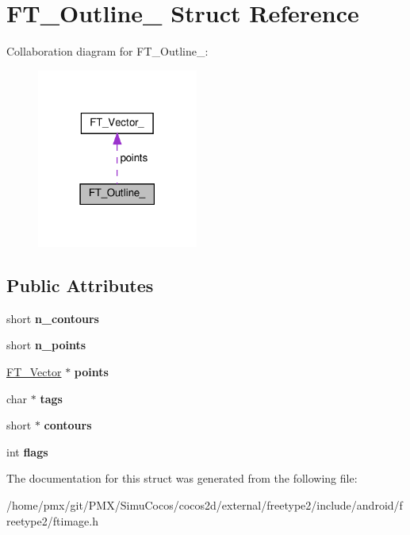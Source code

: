 \hypertarget{structFT__Outline__}{}\section{F\+T\+\_\+\+Outline\+\_\+ Struct Reference}
\label{structFT__Outline__}


Collaboration diagram for F\+T\+\_\+\+Outline\+\_\+\+:
\nopagebreak
\begin{figure}[H]
\begin{center}
\leavevmode
\includegraphics[width=150pt]{structFT__Outline____coll__graph}
\end{center}
\end{figure}
\subsection*{Public Attributes}
\begin{DoxyCompactItemize}
\item 
\mbox{\label{structFT__Outline___a0313ba9c2c51f10e6b7d7ef97bd946e2}} 
short {\bfseries n\+\_\+contours}
\item 
\mbox{\label{structFT__Outline___a7ebcf3c33231af88655534d1ac02b66e}} 
short {\bfseries n\+\_\+points}
\item 
\mbox{\label{structFT__Outline___a33889b70805b688c0e40a342a58f86ee}} 
\hyperlink{structFT__Vector__}{F\+T\+\_\+\+Vector} $\ast$ {\bfseries points}
\item 
\mbox{\label{structFT__Outline___aa8705600b9798b8be2206382956eec54}} 
char $\ast$ {\bfseries tags}
\item 
\mbox{\label{structFT__Outline___a51a8c862defdbc6169f021463897f7a4}} 
short $\ast$ {\bfseries contours}
\item 
\mbox{\label{structFT__Outline___a149765f0be0eab4fc82410cf853964bf}} 
int {\bfseries flags}
\end{DoxyCompactItemize}


The documentation for this struct was generated from the following file\+:\begin{DoxyCompactItemize}
\item 
/home/pmx/git/\+P\+M\+X/\+Simu\+Cocos/cocos2d/external/freetype2/include/android/freetype2/ftimage.\+h\end{DoxyCompactItemize}
